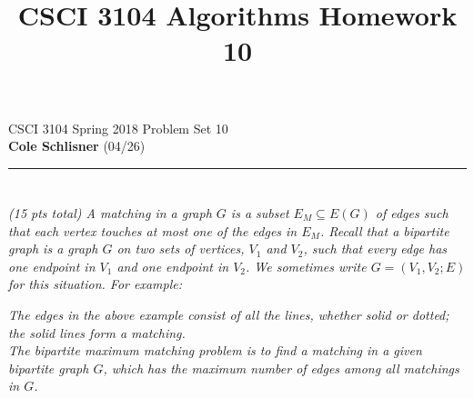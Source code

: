 \documentclass[12pt]{article} \setlength{\oddsidemargin}{0in}
\title{CSCI 3104 Algorithms Homework 10}
\begin{document}
\noindent CSCI 3104 Spring 2018 \hfill Problem Set 10\\
\textbf{Cole Schlisner} (04/26)\\
\noindent\rule{\linewidth}{0.5pt}

\section{}
\textit{(15 pts total) A matching in a graph $G$ is a subset $E_M \subseteq E(G)$ of edges such that each vertex touches at most one of the edges in $E_M$. Recall that a bipartite graph is a graph $G$ on two sets of vertices, $V_1$ and $V_2$, such that every edge has one endpoint in $V_1$ and one endpoint in $V_2$. We sometimes write $G = (V_1, V_2; E)$ for this situation. For example:}

\begin{table}[H]
\centering
{}
\end{table}

\textit{The edges in the above example consist of all the lines, whether solid or dotted; the solid lines form a matching.\\
The bipartite maximum matching problem is to find a matching in a given bipartite graph $G$, which has the maximum number of edges among all matchings in $G$.}
\end{document}
